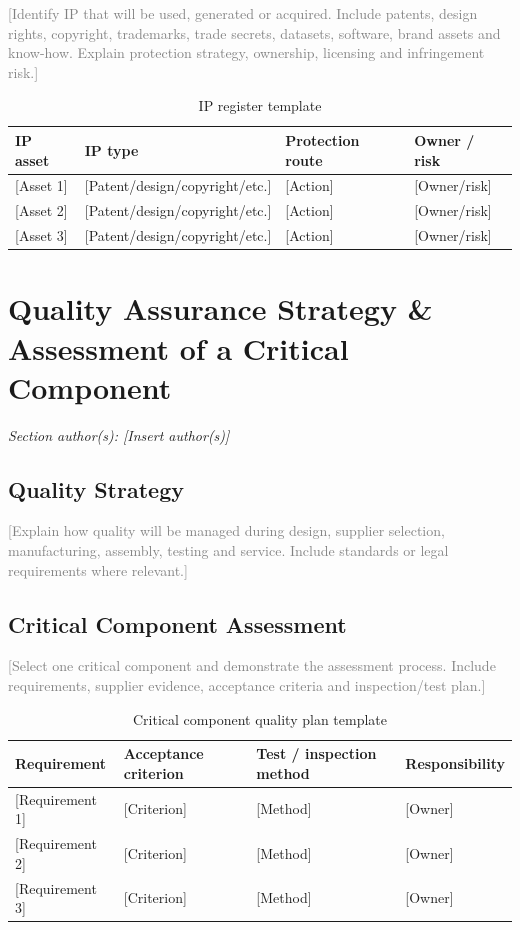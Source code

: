 \documentclass[11pt,a4paper]{article}
\newcommand{\placeholder}[1]{\textcolor{gray}{#1}}
\begin{document}
\placeholder{[Identify IP that will be used, generated or acquired. Include patents, design rights, copyright, trademarks, trade secrets, datasets, software, brand assets and know-how. Explain protection strategy, ownership, licensing and infringement risk.]}

\begin{table}[H]
\centering
\caption{IP register template}
\footnotesize
\begin{tabularx}{\textwidth}{Y L{4cm}Y Y}
\toprule
\textbf{IP asset} & \textbf{IP type} & \textbf{Protection route} & \textbf{Owner / risk} \\
\midrule
{}[Asset 1] & [Patent/design/copyright/etc.] & [Action] & [Owner/risk] \\
{}[Asset 2] & [Patent/design/copyright/etc.] & [Action] & [Owner/risk] \\
{}[Asset 3] & [Patent/design/copyright/etc.] & [Action] & [Owner/risk] \\
\bottomrule
\end{tabularx}
\end{table}

\section{Quality Assurance Strategy \& Assessment of a Critical Component}
\textit{Section author(s): [Insert author(s)]}

\subsection{Quality Strategy}
\placeholder{[Explain how quality will be managed during design, supplier selection, manufacturing, assembly, testing and service. Include standards or legal requirements where relevant.]}

\subsection{Critical Component Assessment}
\placeholder{[Select one critical component and demonstrate the assessment process. Include requirements, supplier evidence, acceptance criteria and inspection/test plan.]}

\begin{table}[H]
\centering
\caption{Critical component quality plan template}
\footnotesize
\begin{tabularx}{\textwidth}{Y Y Y L{3cm}}
\toprule
\textbf{Requirement} & \textbf{Acceptance criterion} & \textbf{Test / inspection method} & \textbf{Responsibility} \\
\midrule
{}[Requirement 1] & [Criterion] & [Method] & [Owner] \\
{}[Requirement 2] & [Criterion] & [Method] & [Owner] \\
{}[Requirement 3] & [Criterion] & [Method] & [Owner] \\
\bottomrule
\end{tabularx}
\end{table}
\end{document}
